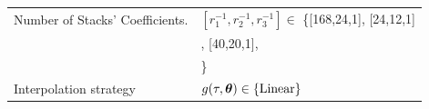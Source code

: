 \begin{table}[!ht]
\begin{tabular}{ll}
    Number of Stacks' Coefficients.                       & $[r^{-1}_{1},r^{-1}_{2},r^{-1}_{3}]\in $ \{[168,24,1], [24,12,1] \\
    &                                                     \quad \quad \quad \quad \quad \quad \quad \quad \quad [180,60,1], [40,20,1], \\ 
    &                                                     \quad \quad \quad \quad \quad \quad \quad \quad \quad [64,8,1] \} \\ 
    Interpolation strategy                                & $g(\tau,\boldsymbol \theta)\in\{\text{Linear}\}$                        \\ \bottomrule 
    \end{tabular}
\end{table}